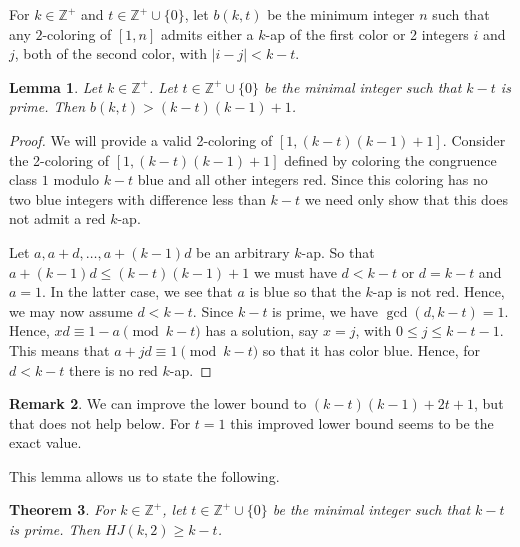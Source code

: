 \documentclass[11pt]{article}
\newtheorem{thm}{Theorem}
\newtheorem{lemma}[thm]{Lemma}
\theoremstyle{definition}
\newtheorem{rem}[thm]{Remark}
\begin{document}
 For $k \in \mathbb{Z}^+$ and $t \in \mathbb{Z}^+ \cup \{0\}$, let $b(k,t)$ be the minimum integer $n$ such that
any $2$-coloring of $[1,n]$ admits either a $k$-ap of the first color or 2 integers $i$ and $j$,
both of the second color, with $|i-j| < k-t$.


\begin{lemma}\label{lem3} Let $k \in \mathbb{Z}^+$.  Let $t \in \mathbb{Z}^+ \cup \{0\}$ be the minimal
integer such that $k-t$ is prime. Then $b(k,t) > (k-t)(k-1)+1$.
\end{lemma}

\begin{proof} We will provide a valid 2-coloring of $[1,(k-t)(k-1)+1]$.
Consider the 2-coloring of $[1,(k-t)(k-1)+1]$ defined by coloring the congruence class $1$ modulo $k-t$
blue and all other integers red.  Since this coloring has no two   blue
integers with difference less than $k-t$ we need only show that this does not admit a red $k$-ap.  

Let
$a,a+d,\dots,a+(k-1)d$ be an arbitrary $k$-ap.  So that $a+(k-1)d \leq (k-t)(k-1)+1$ we must have $d < k-t$ or $d=k-t$ and $a=1$.
In the latter case, we see that $a$ is blue so that the $k$-ap is not red.  Hence, we may now assume $d<k-t$.
Since $k-t$ is prime, we have
$\gcd(d,k-t)=1$.  Hence, $xd \equiv 1-a \pmod{k-t}$ has a solution, say $x=j$,
with $0 \leq j \leq k-t-1$.  This means that $a+jd \equiv 1 \pmod{k-t}$ so that it has color blue.  Hence, for $d<k-t$ there
is no red $k$-ap.  
\end{proof}

\begin{rem} We can improve the lower bound to $(k-t)(k-1)+2t+1$, but that does not help below.
For $t=1$ this improved lower bound seems to be the exact value.
\end{rem}
This lemma allows us to state the following.

\begin{thm}\label{thm4} For $k \in \mathbb{Z}^+$, let $t \in \mathbb{Z}^+ \cup \{0\}$ be the minimal
integer such that $k-t$ is prime. Then $HJ(k,2) \geq k-t$.
\end{thm}
\end{document}

